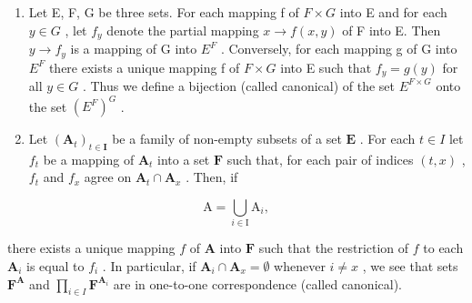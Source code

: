 \begin{enumerate}
\def\labelenumi{\arabic{enumi}.}
\setcounter{enumi}{13}
\item
  Let E, F, G be three sets. For each mapping f of \(F \times G\) into E and for each \(y \in G\) , let \(f_{y}\) denote the partial mapping \(x \to f(x, y)\) of F into E. Then \(y \to f_{y}\) is a mapping of G into \(E^{F}\) . Conversely, for each mapping g of G into \(E^{F}\) there exists a unique mapping f of \(F \times G\) into E such that \(f_{y} = g(y)\) for all \(y \in G\) . Thus we define a bijection (called canonical) of the set \(E^{F \times G}\) onto the set \((E^{F})^{G}\) .
\item
  Let \((\mathbf{A}_t)_{t \in \mathbf{I}}\) be a family of non-empty subsets of a set \(\mathbf{E}\) . For each \(t \in I\) let \(f_t\) be a mapping of \(\mathbf{A}_t\) into a set \(\mathbf{F}\) such that, for each pair of indices \((t, x)\) , \(f_t\) and \(f_x\) agree on \(\mathbf{A}_t \cap \mathbf{A}_x\) . Then, if
\end{enumerate}

\[
\mathrm{A} = \bigcup_ {i \in \mathrm{I}} \mathrm{A} _ {i},
\]

there exists a unique mapping \(f\) of \(\mathbf{A}\) into \(\mathbf{F}\) such that the restriction of \(f\) to each \(\mathbf{A}_i\) is equal to \(f_i\) . In particular, if \(\mathbf{A}_i \cap \mathbf{A}_x = \emptyset\) whenever \(i \neq x\) , we see that sets \(\mathbf{F}^{\mathbf{A}}\) and \(\prod_{i \in I} \mathbf{F}^{\mathbf{A}_i}\) are in one-to-one correspondence (called canonical).


